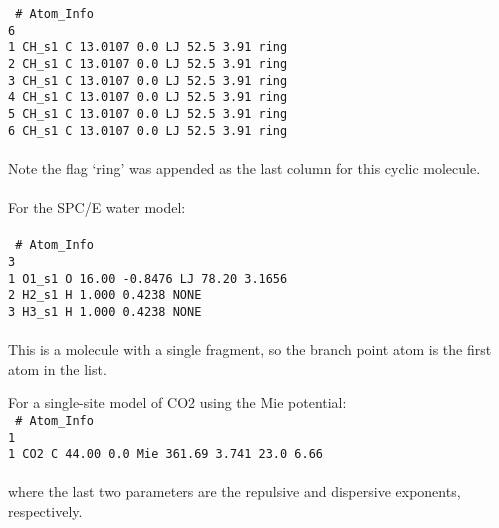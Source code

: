 %
\texttt{
\# Atom\_Info \\
6\\
1    CH\_s1    C    13.0107    0.0    LJ    52.5    3.91 ring\\
2    CH\_s1    C    13.0107    0.0    LJ    52.5    3.91 ring\\
3    CH\_s1    C    13.0107    0.0    LJ    52.5    3.91 ring\\
4    CH\_s1    C    13.0107    0.0    LJ    52.5    3.91 ring\\
5    CH\_s1    C    13.0107    0.0    LJ    52.5    3.91 ring\\
6    CH\_s1    C    13.0107    0.0    LJ    52.5    3.91 ring\\
}
\\
%
Note the flag `ring' was appended as the last column for this cyclic molecule. \\ \\
%
For the SPC/E water model:  \\ \\
%
\texttt{
\# Atom\_Info\\
3\\
1    O1\_s1    O    16.00     -0.8476    LJ    78.20   3.1656\\
2    H2\_s1    H    1.000      0.4238    NONE\\
3    H3\_s1    H    1.000      0.4238    NONE\\
} \\ 
%
This is a molecule with a single fragment, so the branch point atom is the first atom in the list.

For a single-site model of CO2 using the Mie potential:
\\
\texttt{
\# Atom\_Info\\
1\\
1    CO2       C    44.00      0.0       Mie  361.69   3.741   23.0   6.66\\
} \\
where the last two parameters are the repulsive and dispersive exponents, respectively.

